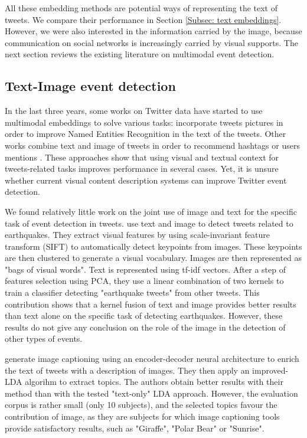All these embedding methods are potential ways of representing the text of tweets. We compare their performance in Section \ref{Subsec: text embeddings}. However, we were also interested in the information carried by the image, because communication on social networks is increasingly carried by visual supports. The next section reviews the existing literature on multimodal event detection.

\subsection{Text-Image event detection}

In the last three years, some works on Twitter data have started to use multimodal embeddings to solve various tasks: \citet{lu2018visual} incorporate tweets pictures in order to improve Named Entities Recognition in the text of the tweets. Other works combine text and image of tweets in order to recommend hashtags \citep{zhang2017hashtag} or users mentions \citep{ma2018mention}. These approaches show that using visual and textual context for tweets-related tasks improves performance in several cases. Yet, it is unsure whether current visual content description systems can improve Twitter event detection. 


We found relatively little work on the joint use of image and text for the specific task of event detection in tweets. \citet{alqhtani2018multiple} use text and image to detect tweets related to earthquakes. They extract  visual features by using scale-invariant feature transform (SIFT) to
automatically detect keypoints from images. These keypoints are then clustered to generate a visual vocabulary. Images are then represented as "bags of visual words". Text is represented using tf-idf vectors. After a step of features selection using PCA, they use a linear combination of two kernels to train a classifier detecting "earthquake tweets" from other tweets. This contribution shows that a kernel fusion of text and image provides better results than text alone on the specific task of detecting earthquakes. However, these results do not give any conclusion on the role of the image in the detection of other types of events.

\citet{zhang2018novel} generate image captioning using an encoder-decoder neural architecture to enrich the text of tweets with a description of images. They then apply an improved-LDA algorihm to extract topics. The authors obtain better results with their method than with the tested "text-only" LDA approach. However, the evaluation corpus is rather small (only 10 subjects), and the selected topics favour the contribution of image, as they are subjects for which image captioning tools provide satisfactory results, such as "Giraffe", "Polar Bear" or "Sunrise".  

